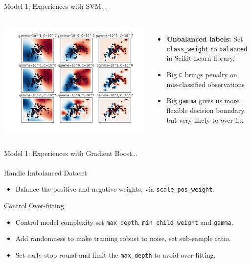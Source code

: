 \documentclass{beamer}
\begin{document}
\begin{frame}{Model 1: Experiences with SVM...}
  \framesubtitle{}
  \begin{columns}
    \includegraphics[scale=0.3]{img/coaram.png}
    \begin{itemize}
      \item \textbf{Unbalanced labels:} Set \texttt{class\_weight} to \texttt{balanced} in
        Scikit-Learn library.
      \item Big \texttt{C} brings penalty on mis-classified observations

      \item Big \texttt{gamma} gives us more flexible decision boundary, but very
          likely to over-fit.
    \end{itemize}
  \end{columns}
\end{frame}


\begin{frame}{Model 1: Experiences with Gradient Boost...}
  \framesubtitle{}

  \begin{block}{Handle Imbalanced Dataset}
    \begin{itemize}
    \item Balance the positive and negative weights, via \texttt{scale\_pos\_weight}.
    \end{itemize}
  \end{block}


  \begin{block}{Control Over-fitting}
    \begin{itemize}
    \item Control model complexity set \texttt{max\_depth}, \texttt{min\_child\_weight} and \texttt{gamma}.
    \item Add randomness to make training robust to noise, set sub-sample ratio.
    \item Set early stop round and limit the \texttt{max\_depth} to avoid over-fitting.
    \end{itemize}
  \end{block}

\end{frame}
\end{document}
